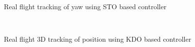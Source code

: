 \documentclass[letterpaper%
, twoside%
, 12pt%
,memoire%
, english%
,creativecommons,hyperref%
]{thETS}
\begin{document}
\begin{figure}[H]
	\centering
	 \\ \parbox{0.75\textwidth}{\caption{Real flight tracking of yaw using STO based controller\label{Fig:yawtracKDO}}}
\end{figure}
\begin{figure}[H]
	\centering
	 \\ \parbox{0.75\textwidth}{\caption{Real flight 3D tracking of position using KDO based controller\label{Fig:3dKDO}}}
\end{figure}
\FloatBarrier
\end{document}
